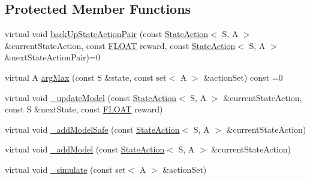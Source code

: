 \subsection*{Protected Member Functions}
\begin{DoxyCompactItemize}
\item 
virtual void \hyperlink{classAI_1_1Algorithm_1_1DynaQBase_a0d5777706e9c2be04ee1834ad593c795}{back\-Up\-State\-Action\-Pair} (const \hyperlink{classAI_1_1StateAction}{State\-Action}$<$ S, A $>$ \&current\-State\-Action, const \hyperlink{namespaceAI_a41b74884a20833db653dded3918e05c3}{F\-L\-O\-A\-T} reward, const \hyperlink{classAI_1_1StateAction}{State\-Action}$<$ S, A $>$ \&next\-State\-Action\-Pair)=0
\item 
virtual A \hyperlink{classAI_1_1Algorithm_1_1DynaQBase_a32044f721ba4afbca5ea144b3f84135b}{arg\-Max} (const S \&state, const set$<$ A $>$ \&action\-Set) const =0
\item 
virtual void \hyperlink{classAI_1_1Algorithm_1_1DynaQBase_a4a45b9303a4b9e0cf93b9a5272739b35}{\-\_\-update\-Model} (const \hyperlink{classAI_1_1StateAction}{State\-Action}$<$ S, A $>$ \&current\-State\-Action, const S \&next\-State, const \hyperlink{namespaceAI_a41b74884a20833db653dded3918e05c3}{F\-L\-O\-A\-T} reward)
\item 
virtual void \hyperlink{classAI_1_1Algorithm_1_1DynaQBase_a0524b63604a75fd079b85a3a6e6ac93d}{\-\_\-add\-Model\-Safe} (const \hyperlink{classAI_1_1StateAction}{State\-Action}$<$ S, A $>$ \&current\-State\-Action)
\item 
virtual void \hyperlink{classAI_1_1Algorithm_1_1DynaQBase_aefe879b3103a6c4f46176d9fcb1a911d}{\-\_\-add\-Model} (const \hyperlink{classAI_1_1StateAction}{State\-Action}$<$ S, A $>$ \&current\-State\-Action)
\item 
virtual void \hyperlink{classAI_1_1Algorithm_1_1DynaQBase_ae33343ea87f96ee3a2c2651bfd2cbcc5}{\-\_\-simulate} (const set$<$ A $>$ \&action\-Set)
\end{DoxyCompactItemize}
